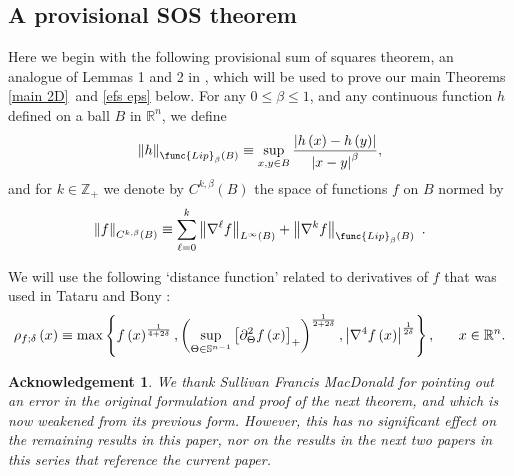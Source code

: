 \documentclass{amsart}
\theoremstyle{plain}
\newtheorem{acknowledgement}{Acknowledgement}
\numberwithin{equation}{section}
\begin{document}
\subsection{A provisional SOS theorem}

Here we begin with the following provisional sum of squares theorem, an
analogue of Lemmas 1 and 2 in \cite{FePh}, which will be used to prove our
main Theorems \ref{main 2D}\ and \ref{efs eps} below. For any $0\leq \beta
\leq 1$, and any continuous function $h$ defined on a ball $B$ in $\mathbb{R}%
^{n}$, we define%
\begin{equation*}
\left\Vert h\right\Vert _{\func{Lip}_{\beta }\left( B\right) }\equiv
\sup_{x,y\in B}\frac{\left\vert h\left( x\right) -h\left( y\right)
\right\vert }{\left\vert x-y\right\vert ^{\beta }},
\end{equation*}%
and for $k\in \mathbb{Z}_{+}$ we denote by $C^{k,\beta }\left( B\right) $
the space of functions $f$ on $B$ normed by%
\begin{equation*}
\left\Vert f\right\Vert _{C^{k,\beta }\left( B\right) }\equiv \sum_{\ell
=0}^{k}\left\Vert \nabla ^{\ell }f\right\Vert _{L^{\infty }\left( B\right)
}+\left\Vert \nabla ^{k}f\right\Vert _{\func{Lip}_{\beta }\left( B\right) }\
.
\end{equation*}

We will use the following `distance function' related to derivatives of $f$
that was used in Tataru \cite{Tat} and Bony \cite{Bon}:%
\begin{equation}
\rho _{f;\delta }\left( x\right) \equiv \max \left\{ f\left( x\right) ^{%
\frac{1}{4+2\delta }},\left( \sup_{\Theta \in \mathbb{S}^{n-1}}\left[
\partial _{\Theta }^{2}f\left( x\right) \right] _{+}\right) ^{\frac{1}{%
2+2\delta }},\left\vert \nabla ^{4}f\left( x\right) \right\vert ^{\frac{1}{%
2\delta }}\right\} ,\ \ \ \ \ x\in \mathbb{R}^{n}.  \label{def rho}
\end{equation}

\begin{acknowledgement}
We thank Sullivan Francis MacDonald for pointing out an error in the
original formulation and proof of the next theorem, and which is now
weakened from its previous form. However, this has no significant effect on
the remaining results in this paper, nor on the results in the next two
papers in this series that reference the current paper.
\end{acknowledgement}
\end{document}
